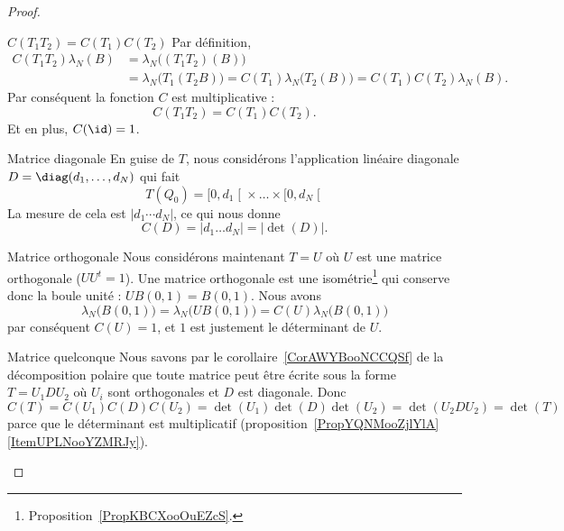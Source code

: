 \begin{proof}
    \begin{subproof}
        \item[\( C(T_1T_2)=C(T_1)C(T_2)\)]
            Par définition,
            \begin{subequations}
                \begin{align}
                    C(T_1T_2)\lambda_N(B)&=\lambda_N\big( (T_1T_2)(B) \big)\\
                    &=\lambda_N\big( T_1(T_2B) \big)=C(T_1)\lambda_N\big( T_2(B) \big)=C(T_1)C(T_2)\lambda_N(B).
                \end{align}
            \end{subequations}
            Par conséquent la fonction \( C\) est multiplicative :
            \begin{equation}
                C(T_1T_2)=C(T_1)C(T_2).
            \end{equation}
            Et en plus, \( C(\id)=1\).
        \item[Matrice diagonale]
            En guise de \( T\), nous considérons l'application linéaire diagonale \( D=\diag(d_1,\ldots, d_N)\) qui fait
            \begin{equation}
                T(Q_0)=\mathopen[ 0 , d_1 \mathclose[\times \ldots\times \mathopen[  0, d_N \mathclose[
            \end{equation}
            La mesure de cela est \( |d_1\cdots d_N|\), ce qui nous donne
            \begin{equation}
                C(D)=| d_1\ldots d_N |=| \det(D) |.
            \end{equation}
        \item[Matrice orthogonale]
            Nous considérons maintenant \( T=U\) où \( U\) est une matrice orthogonale (\( UU^t=1\)). Une matrice orthogonale est une isométrie\footnote{Proposition~\ref{PropKBCXooOuEZcS}.} qui conserve donc la boule unité : \( UB(0,1)=B(0,1)\). Nous avons
            \begin{equation}
                \lambda_N\big( B(0,1) \big)=\lambda_N\big( UB(0,1) \big)=C(U)\lambda_N\big( B(0,1) \big)
            \end{equation}
            par conséquent \( C(U)=1\), et \( 1\) est justement le déterminant de \( U\).
        \item[Matrice quelconque]
            Nous savons par le corollaire~\ref{CorAWYBooNCCQSf} de la décomposition polaire que toute matrice peut être écrite sous la forme \( T=U_1DU_2\) où \( U_i\) sont orthogonales et \( D\) est diagonale. Donc \( C(T)=C(U_1)C(D)C(U_2)=\det(U_1)\det(D)\det(U_2)=\det(U_2DU_2)=\det(T)\) parce que le déterminant est multiplicatif (proposition~\ref{PropYQNMooZjlYlA}\ref{ItemUPLNooYZMRJy}).
    \end{subproof}
\end{proof}

